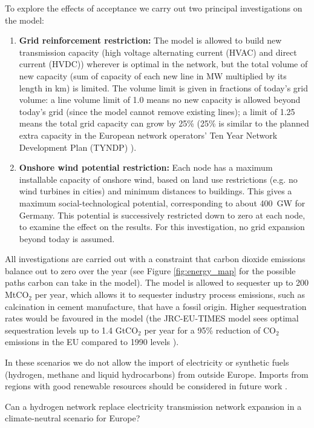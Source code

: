 To explore the effects of acceptance we carry out two principal investigations
on the model:
\begin{enumerate}
\item {\bf Grid reinforcement restriction:} The model is allowed to build new
transmission capacity (high voltage alternating current (HVAC) and direct
current (HVDC)) wherever is optimal in the network, but the total volume of new
capacity (sum of capacity of each new line in MW multiplied by its length in km)
is limited. The volume limit is given in fractions of today's grid volume: a
line volume limit of 1.0 means no new capacity is allowed beyond today's grid
(since the model cannot remove existing lines); a limit of 1.25 means the total
grid capacity can grow by 25\% (25\% is similar to the planned extra capacity in
the European network operators' Ten Year Network Development Plan (TYNDP)
\cite{TYNDP2016}).
\item {\bf Onshore wind potential restriction:} Each node has a maximum
installable capacity of onshore wind, based on land use restrictions (e.g. no
wind turbines in cities) and minimum distances to buildings. This gives a
maximum social-technological potential, corresponding to about 400~GW for
Germany. This potential is successively restricted down to zero at each node, to
examine the effect on the results. For this investigation, no grid expansion
beyond today is assumed.
\end{enumerate}

All investigations are carried out with a constraint that carbon dioxide
emissions balance out to zero over the year (see Figure \ref{fig:energy_map} for
the possible paths carbon can take in the model). The model is allowed to
sequester up to 200 MtCO$_2$ per year, which allows it to sequester industry
process emissions, such as calcination in cement manufacture, that have a fossil
origin. Higher sequestration rates would be favoured in the model (the
JRC-EU-TIMES model sees optimal sequestration levels up to 1.4 GtCO$_2$ per year
for a 95\% reduction of CO$_2$ emissions in the EU compared to 1990 levels
\cite{BLANCO2018617}).

In these scenarios we do not allow the import of electricity or synthetic fuels
(hydrogen, methane and liquid hydrocarbons) from outside Europe. Imports from
regions with good renewable resources should be considered in future work
\cite{su9020306,HEUSER201912733}.

Can a hydrogen network replace electricity transmission network expansion in a climate-neutral scenario for Europe?

